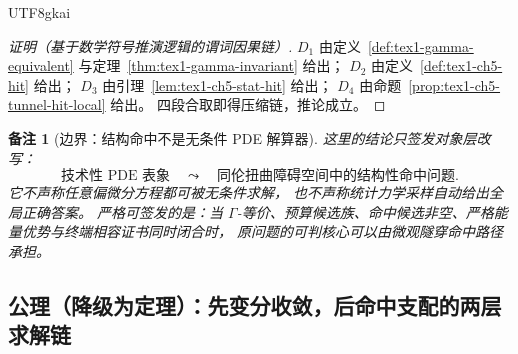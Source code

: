 \documentclass[12pt]{article}
\newtheorem{remark}{备注}[section]
\begin{document}
\begin{CJK*}{UTF8}{gkai}
\begin{proof}[证明（基于数学符号推演逻辑的谓词因果链）]
\(D_1\) 由定义~\ref{def:tex1-gamma-equivalent} 与定理~\ref{thm:tex1-gamma-invariant} 给出；
\(D_2\) 由定义~\ref{def:tex1-ch5-hit} 给出；
\(D_3\) 由引理~\ref{lem:tex1-ch5-stat-hit} 给出；
\(D_4\) 由命题~\ref{prop:tex1-ch5-tunnel-hit-local} 给出。
四段合取即得压缩链，推论成立。
\end{proof}

\begin{remark}[边界：结构命中不是无条件 PDE 解算器]
这里的结论只签发对象层改写：
\[
  \text{技术性 PDE 表象}
  \quad\leadsto\quad
  \text{同伦扭曲障碍空间中的结构性命中问题}.
\]
它不声称任意偏微分方程都可被无条件求解，
也不声称统计力学采样自动给出全局正确答案。
严格可签发的是：当 \(\Gamma\)-等价、预算候选族、命中候选非空、严格能量优势与终端相容证书同时闭合时，
原问题的可判核心可以由微观隧穿命中路径承担。
\end{remark}

\subsection{公理（降级为定理）：先变分收敛，后命中支配的两层求解链}
\label{subsec:tex1-ch5-axiom-downgraded}


\end{CJK*}
\end{document}
